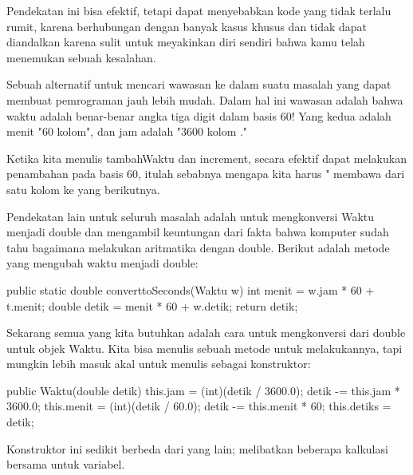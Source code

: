 Pendekatan ini bisa efektif, tetapi dapat menyebabkan kode yang tidak terlalu rumit, karena berhubungan dengan banyak kasus khusus dan tidak dapat diandalkan karena sulit untuk meyakinkan diri sendiri bahwa kamu telah menemukan sebuah kesalahan.

Sebuah alternatif untuk mencari wawasan ke dalam suatu masalah yang dapat membuat pemrograman jauh lebih mudah. Dalam hal ini wawasan adalah bahwa waktu adalah benar-benar angka tiga digit dalam basis 60! Yang kedua adalah menit "60 kolom", dan jam adalah "3600 kolom ."

Ketika kita menulis tambahWaktu dan increment, secara efektif dapat melakukan penambahan pada basis 60, itulah sebabnya mengapa kita harus " membawa dari satu kolom ke yang berikutnya.

Pendekatan lain untuk seluruh masalah adalah untuk mengkonversi Waktu menjadi double dan mengambil keuntungan dari fakta bahwa komputer sudah tahu bagaimana melakukan aritmatika dengan double. Berikut adalah metode yang mengubah waktu menjadi double:

\newline

public static double converttoSeconds(Waktu w)\textbraceleft \newline
	int menit = w.jam * 60 + t.menit; \newline
	double detik = menit * 60 + w.detik; \newline
	return detik; \newline
\textbraceright \newline

Sekarang semua yang kita butuhkan adalah cara untuk mengkonversi dari double untuk objek Waktu. Kita bisa menulis sebuah metode untuk melakukannya, tapi mungkin lebih masuk akal untuk menulis sebagai konstruktor:

\newline
public Waktu(double detik)\textbraceleft \newline
	this.jam = (int)(detik / 3600.0); \newline
	detik -= this.jam * 3600.0; \newline
	this.menit = (int)(detik / 60.0); \newline
	detik -= this.menit * 60; \newline
	this.detiks = detik; \newline
\textbraceright \newline

Konstruktor ini sedikit berbeda dari yang lain; melibatkan beberapa kalkulasi bersama untuk variabel.

